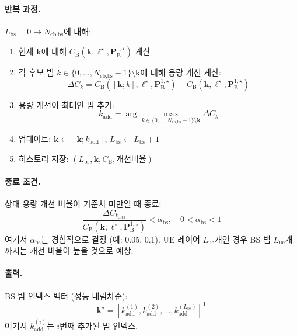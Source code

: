 \documentclass[10pt]{article}
\begin{document}
\paragraph{반복 과정.}
$L_{\text{bs}} = 0 \rightarrow N_{\text{cb,bs}}$에 대해:
\begin{enumerate}
    \item 현재 $\boldsymbol{k}$에 대해 $C_{\text{B}}(\boldsymbol{k}, \boldsymbol{\ell}^{\star}, \mathbf{P}_{\text{B}}^{1,\star})$ 계산
    \item 각 후보 빔 $k \in \{0, \ldots, N_{\text{cb,bs}}-1\} \setminus \boldsymbol{k}$에 대해 용량 개선 계산:
    \begin{equation}
    \Delta C_k = C_{\text{B}}([\boldsymbol{k}; k], \boldsymbol{\ell}^{\star}, \mathbf{P}_{\text{B}}^{1,\star}) - C_{\text{B}}(\boldsymbol{k}, \boldsymbol{\ell}^{\star}, \mathbf{P}_{\text{B}}^{1,\star})
    \end{equation}
    \item 용량 개선이 최대인 빔 추가:
    \begin{equation}
    k_{\text{add}} = \arg\max_{k \in \{0,\ldots,N_{\text{cb,bs}}-1\} \setminus \boldsymbol{k}} \Delta C_k
    \end{equation}
    \item 업데이트: $\boldsymbol{k} \leftarrow [\boldsymbol{k}; k_{\text{add}}]$, $L_{\text{bs}} \leftarrow L_{\text{bs}} + 1$
    \item 히스토리 저장: $(L_{\text{bs}}, \boldsymbol{k}, C_{\text{B}}, \text{개선비율})$
\end{enumerate}

\paragraph{종료 조건.}
상대 용량 개선 비율이 기준치 미만일 때 종료:
\begin{equation}
\frac{\Delta C_{k_{\text{add}}}}{C_{\text{B}}(\boldsymbol{k}, \boldsymbol{\ell}^{\star}, \mathbf{P}_{\text{B}}^{1,\star})} < \alpha_{\text{bs}}, \quad 0 < \alpha_{\text{bs}} < 1
\end{equation}
여기서 $\alpha_{\text{bs}}$는 경험적으로 결정 (예: 0.05, 0.1). UE 레이어 $L_{\text{ue}}$개인 경우 BS 빔 $L_{\text{ue}}$개까지는 개선 비율이 높을 것으로 예상.

\paragraph{출력.}
BS 빔 인덱스 벡터 (성능 내림차순):
\begin{equation}
\boldsymbol{k}^{\star} = [k_{\text{add}}^{(1)}, k_{\text{add}}^{(2)}, \ldots, k_{\text{add}}^{(L_{\text{bs}})}]^{\mathsf{T}}
\end{equation}
여기서 $k_{\text{add}}^{(i)}$는 $i$번째 추가된 빔 인덱스.
\end{document}
